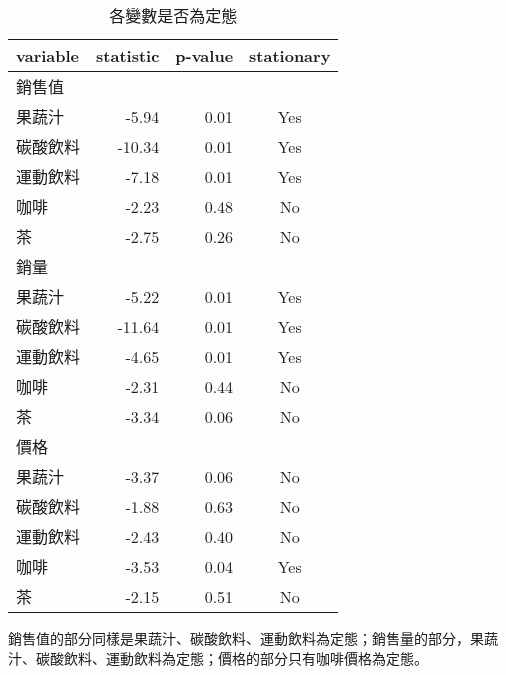 \begin{table}[H]
    \caption{各變數是否為定態} \label{tab:stationarity}
    \centering 
    \footnotesize
    \begin{tabular}{ l r r c }
        \hline
        \textbf{variable} & \textbf{statistic} & \textbf{p-value} & \textbf{stationary} \\
        \hline
        銷售值 & & &  \\
        果蔬汁  & -5.94 & 0.01 & Yes \\
        碳酸飲料   & -10.34 & 0.01 & Yes \\
        運動飲料   & -7.18 & 0.01 & Yes \\
        咖啡   & -2.23 & 0.48 & No \\
        茶   & -2.75 & 0.26 & No \\
        銷量 & & &  \\
        果蔬汁   & -5.22 & 0.01 & Yes \\
        碳酸飲料   & -11.64 & 0.01 & Yes \\
        運動飲料   & -4.65 & 0.01 & Yes \\
        咖啡   & -2.31 & 0.44 & No \\
        茶   & -3.34 & 0.06 & No \\
        價格 & & & \\
        果蔬汁 & -3.37 & 0.06 & No \\
        碳酸飲料 & -1.88 & 0.63 & No \\
        運動飲料 & -2.43 & 0.40 & No \\
        咖啡 & -3.53 & 0.04 & Yes \\
        茶 & -2.15 & 0.51 & No \\
        \hline
    \end{tabular}
\end{table}
\vspace{-1.5em}
\begin{singlespace}
    \begin{footnotesize}
        \raggedright
         銷售值的部分同樣是果蔬汁、碳酸飲料、運動飲料為定態；銷售量的部分，果蔬汁、碳酸飲料、運動飲料為定態；價格的部分只有咖啡價格為定態。
    \end{footnotesize}
\end{singlespace}

\newpage

